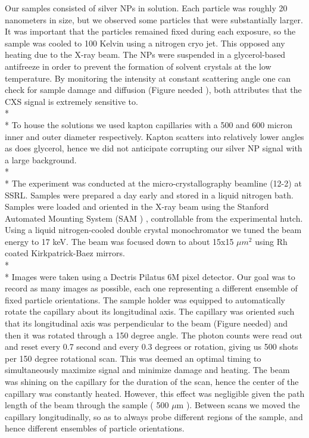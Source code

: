 \documentclass[a4paper,12pt]{article}
\begin{document}
Our samples consisted of silver NPs in solution. Each particle was roughly 20 nanometers in size, but we observed some particles that were substantially larger. It was important that the particles remained fixed during each exposure, so the sample was cooled to 100 Kelvin using a nitrogen cryo jet. This opposed any heating due to the X-ray beam. The NPs were suspended in a glycerol-based antifreeze in order to prevent the formation of solvent crystals at the low temperature. By monitoring the intensity at constant scattering angle one can check for sample damage and diffusion (Figure needed ), both attributes that the CXS signal is extremely sensitive to.
\\*
\\*
\noindent To house the solutions we used kapton capillaries with a 500 and 600 micron inner and outer diameter respectively. Kapton scatters into relatively lower angles as does glycerol, hence we did not anticipate corrupting our silver NP signal with a large background. 
\\*
\\*
\noindent The experiment was conducted at the micro-crystallography beamline (12-2) at SSRL. Samples were prepared a day early and stored in a liquid nitrogen bath. Samples were loaded and oriented in the X-ray beam using the Stanford Automated Mounting System (SAM ) , controllable from the experimental hutch. Using a liquid nitrogen-cooled double crystal monochromator we tuned the beam energy to 17 keV. The beam was focused down to about 15x15 $\mu m ^{2}$ using Rh coated Kirkpatrick-Baez mirrors.
\\*
\\*
\noindent Images were taken using a Dectris Pilatus 6M pixel detector. Our goal was to record as many images as possible, each one representing a different ensemble of fixed particle orientations. The sample holder was equipped to automatically rotate the capillary about its longitudinal axis. The capillary was oriented such that its longitudinal axis was perpendicular to the beam (Figure needed) and then it was rotated through a 150 degree angle. The photon counts were read out and reset every 0.7 second and every 0.3 degrees or rotation, giving us 500 shots per 150 degree rotational scan. This was deemed an optimal timing to simultaneously maximize signal and minimize damage and heating. The beam was shining on the capillary for the duration of the scan, hence the center of the capillary was constantly heated. However, this effect was negligible given the path length of the beam through the sample ( 500 $\mu$m ). Between scans we moved the capillary longitudinally, so as to always probe different regions of the sample, and hence different ensembles of particle orientations.
\end{document}
